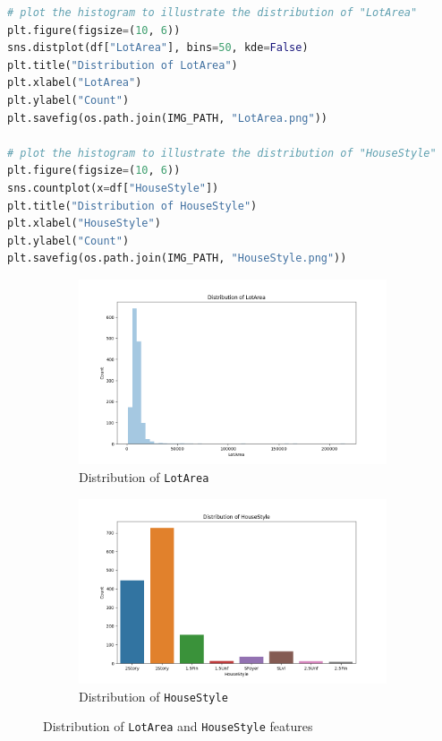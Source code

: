 \documentclass[10pt]{article}
\begin{document}
\begin{lstlisting}[language=Python, label={lst:feature_distribution_vis}, caption={Plotting the histogram to illustrate the distribution of \texttt{LotArea} and \texttt{HouseStyle}}]
# plot the histogram to illustrate the distribution of "LotArea"
plt.figure(figsize=(10, 6))
sns.distplot(df["LotArea"], bins=50, kde=False)
plt.title("Distribution of LotArea")
plt.xlabel("LotArea")
plt.ylabel("Count")
plt.savefig(os.path.join(IMG_PATH, "LotArea.png"))

# plot the histogram to illustrate the distribution of "HouseStyle"
plt.figure(figsize=(10, 6))
sns.countplot(x=df["HouseStyle"])
plt.title("Distribution of HouseStyle")
plt.xlabel("HouseStyle")
plt.ylabel("Count")
plt.savefig(os.path.join(IMG_PATH, "HouseStyle.png"))
\end{lstlisting}

\begin{figure}[!htbp]
    \centering
    \begin{subfigure}[b]{0.9\textwidth}
        \centering
        \includegraphics[width=\textwidth]{../hw1/img/Part_I/LotArea.png}
        \caption{Distribution of \texttt{LotArea}}
    \end{subfigure}
    \hfill
    \begin{subfigure}[b]{0.9\textwidth}
        \centering
        \includegraphics[width=\textwidth]{../hw1/img/Part_I/HouseStyle.png}
        \caption{Distribution of \texttt{HouseStyle}}
    \end{subfigure}
    \caption{Distribution of \texttt{LotArea} and \texttt{HouseStyle} features}
    \label{fig:feature_distribution}
\end{figure}
\end{document}
